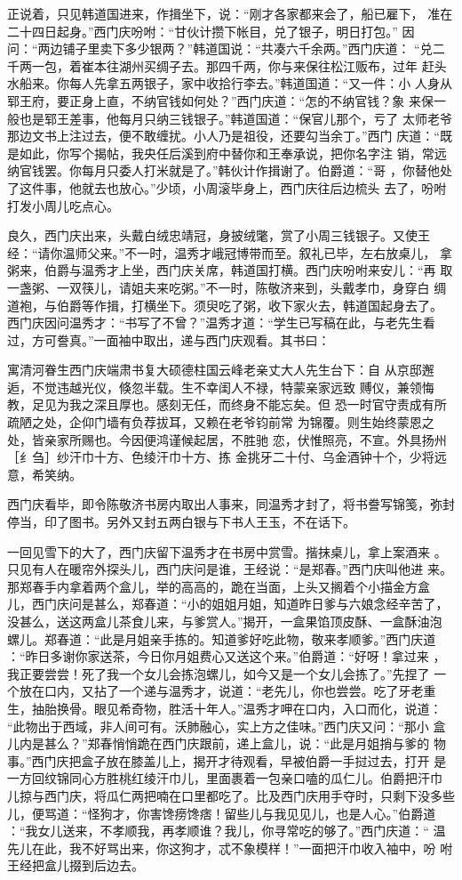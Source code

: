 正说着，只见韩道国进来，作揖坐下，说：“刚才各家都来会了，船已雇下，
准在二十四日起身。”西门庆吩咐：“甘伙计攒下帐目，兑了银子，明日打包。”
因问：“两边铺子里卖下多少银两？”韩道国说：“共凑六千余两。”西门庆道：
“兑二千两一包，着崔本往湖州买绸子去。那四千两，你与来保往松江贩布，过年
赶头水船来。你每人先拿五两银子，家中收拾行李去。”韩道国道：“又一件：小
人身从郓王府，要正身上直，不纳官钱如何处？”西门庆道：“怎的不纳官钱？象
来保一般也是郓王差事，他每月只纳三钱银子。”韩道国道：“保官儿那个，亏了
太师老爷那边文书上注过去，便不敢缠扰。小人乃是祖役，还要勾当余丁。”西门
庆道：“既是如此，你写个揭帖，我央任后溪到府中替你和王奉承说，把你名字注
销，常远纳官钱罢。你每月只委人打米就是了。”韩伙计作揖谢了。伯爵道：“哥
，你替他处了这件事，他就去也放心。”少顷，小周滚毕身上，西门庆往后边梳头
去了，吩咐打发小周儿吃点心。

良久，西门庆出来，头戴白绒忠靖冠，身披绒氅，赏了小周三钱银子。又使王
经：“请你温师父来。”不一时，温秀才峨冠博带而至。叙礼已毕，左右放桌儿，
拿粥来，伯爵与温秀才上坐，西门庆关席，韩道国打横。西门庆吩咐来安儿：“再
取一盏粥、一双筷儿，请姐夫来吃粥。”不一时，陈敬济来到，头戴孝巾，身穿白
绸道袍，与伯爵等作揖，打横坐下。须臾吃了粥，收下家火去，韩道国起身去了。
西门庆因问温秀才：“书写了不曾？”温秀才道：“学生已写稿在此，与老先生看
过，方可誊真。”一面袖中取出，递与西门庆观看。其书曰：

寓清河眷生西门庆端肃书复大硕德柱国云峰老亲丈大人先生台下：自
从京邸邂逅，不觉违越光仪，倏忽半载。生不幸闺人不禄，特蒙亲家远致
赙仪，兼领悔教，足见为我之深且厚也。感刻无任，而终身不能忘矣。但
恐一时官守责成有所疏陋之处，企仰门墙有负荐拔耳，又赖在老爷钧前常
为锦覆。则生始终蒙恩之处，皆亲家所赐也。今因便鸿谨候起居，不胜驰
恋，伏惟照亮，不宣。外具扬州［纟刍］纱汗巾十方、色绫汗巾十方、拣
金挑牙二十付、乌金酒钟十个，少将远意，希笑纳。

西门庆看毕，即令陈敬济书房内取出人事来，同温秀才封了，将书誊写锦笺，弥封
停当，印了图书。另外又封五两白银与下书人王玉，不在话下。

一回见雪下的大了，西门庆留下温秀才在书房中赏雪。揩抹桌儿，拿上案酒来
。只见有人在暖帘外探头儿，西门庆问是谁，王经说：“是郑春。”西门庆叫他进
来。那郑春手内拿着两个盒儿，举的高高的，跪在当面，上头又搁着个小描金方盒
儿，西门庆问是甚么，郑春道：“小的姐姐月姐，知道昨日爹与六娘念经辛苦了，
没甚么，送这两盒儿茶食儿来，与爹赏人。”揭开，一盒果馅顶皮酥、一盒酥油泡
螺儿。郑春道：“此是月姐亲手拣的。知道爹好吃此物，敬来孝顺爹。”西门庆道
：“昨日多谢你家送茶，今日你月姐费心又送这个来。”伯爵道：“好呀！拿过来
，我正要尝尝！死了我一个女儿会拣泡螺儿，如今又是一个女儿会拣了。”先捏了
一个放在口内，又拈了一个递与温秀才，说道：“老先儿，你也尝尝。吃了牙老重
生，抽胎换骨。眼见希奇物，胜活十年人。”温秀才呷在口内，入口而化，说道：
“此物出于西域，非人间可有。沃肺融心，实上方之佳味。”西门庆又问：“那小
盒儿内是甚么？”郑春悄悄跪在西门庆跟前，递上盒儿，说：“此是月姐捎与爹的
物事。”西门庆把盒子放在膝盖儿上，揭开才待观看，早被伯爵一手挝过去，打开
是一方回纹锦同心方胜桃红绫汗巾儿，里面裹着一包亲口嗑的瓜仁儿。伯爵把汗巾
儿掠与西门庆，将瓜仁两把喃在口里都吃了。比及西门庆用手夺时，只剩下没多些
儿，便骂道：“怪狗才，你害馋痨馋痞！留些儿与我见见儿，也是人心。”伯爵道
：“我女儿送来，不孝顺我，再孝顺谁？我儿，你寻常吃的够了。”西门庆道：“
温先儿在此，我不好骂出来，你这狗才，忒不象模样！”一面把汗巾收入袖中，吩
咐王经把盒儿掇到后边去。

